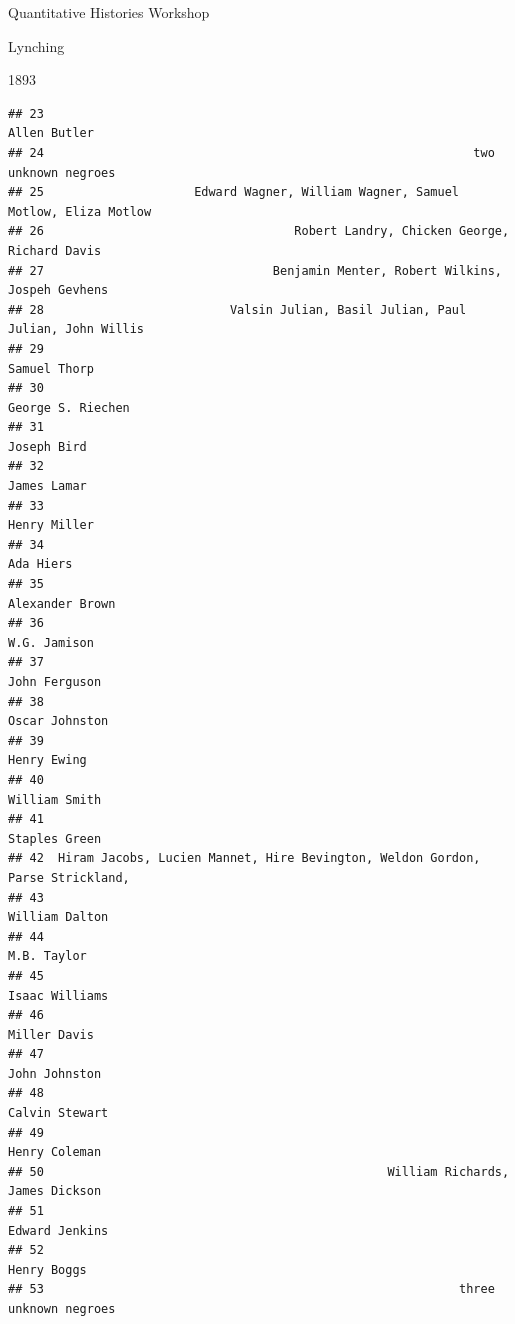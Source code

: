 \documentclass[
  ignorenonframetext,
]{beamer}
\begin{document}
\begin{frame}[fragile]{Quantitative Histories Workshop}
\begin{block}{Lynching}
\begin{block}{1893}
\begin{verbatim}
## 23                                                                   Allen Butler
## 24                                                            two unknown negroes
## 25                     Edward Wagner, William Wagner, Samuel Motlow, Eliza Motlow
## 26                                   Robert Landry, Chicken George, Richard Davis
## 27                                Benjamin Menter, Robert Wilkins, Jospeh Gevhens
## 28                          Valsin Julian, Basil Julian, Paul Julian, John Willis
## 29                                                                   Samuel Thorp
## 30                                                              George S. Riechen
## 31                                                                    Joseph Bird
## 32                                                                    James Lamar
## 33                                                                   Henry Miller
## 34                                                                      Ada Hiers
## 35                                                                Alexander Brown
## 36                                                                   W.G. Jamison
## 37                                                                  John Ferguson
## 38                                                                 Oscar Johnston
## 39                                                                    Henry Ewing
## 40                                                                  William Smith
## 41                                                                  Staples Green
## 42  Hiram Jacobs, Lucien Mannet, Hire Bevington, Weldon Gordon, Parse Strickland,
## 43                                                                 William Dalton
## 44                                                                    M.B. Taylor
## 45                                                                 Isaac Williams
## 46                                                                   Miller Davis
## 47                                                                  John Johnston
## 48                                                                 Calvin Stewart
## 49                                                                  Henry Coleman
## 50                                                William Richards, James Dickson
## 51                                                                 Edward Jenkins
## 52                                                                    Henry Boggs
## 53                                                          three unknown negroes

\end{verbatim}
\end{block}
\end{block}
\end{frame}
\end{document}
